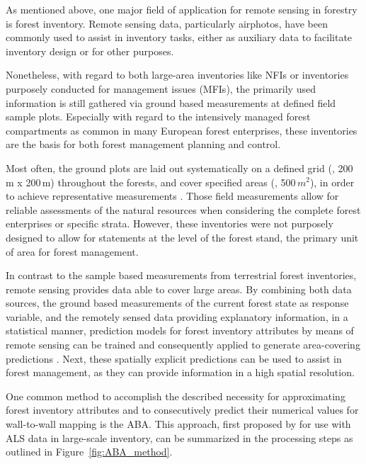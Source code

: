 As mentioned above, one major field of application for remote sensing in forestry is forest inventory.
Remote sensing data, particularly airphotos, have been commonly used to assist in inventory tasks, 
either as auxiliary data to facilitate inventory design or for other purposes. 

Nonetheless, with regard to both large-area inventories like \acp{NFI} or inventories purposely conducted for management issues
(\acsp{MFI}), the primarily used information is still gathered via ground based measurements at defined field sample plots.
Especially with regard to the intensively managed forest compartments as common in many European forest enterprises,
these inventories are the basis for both forest management planning and control. 

Most often, the ground plots are laid out systematically on a defined grid (\eg, 200\,m x 200\,m) throughout the forests, 
and cover specified areas (\eg, 500\,$m^2$), in order to achieve representative measurements \parencite[\eg,][]{Neufanger.2011}. 
Those field measurements allow for reliable assessments of the natural resources when considering the complete forest enterprises or 
specific strata. However, these inventories were not purposely designed to allow for statements at the level of the forest stand,
the primary unit of area for forest management. 

In contrast to the sample based measurements from terrestrial forest inventories, remote sensing provides data able to cover large areas.
By combining both data sources, the ground based measurements of the current forest state as response variable,
and the remotely sensed data providing explanatory information, in a statistical manner,
prediction models for forest inventory attributes by means of remote sensing can be trained and consequently applied to generate 
area-covering predictions \parencite{White.2013}. Next, these spatially explicit predictions can be used to assist in forest management, as they can provide information 
in a high spatial resolution.

One common method to accomplish the described necessity for approximating forest inventory attributes
and to consecutively predict their numerical values for wall-to-wall mapping is 
the \ac{ABA}. 
This approach,
first proposed by \textcite{Naesset.2002b} for use with \ac{ALS} data in large-scale inventory, 
can be summarized in the processing steps as outlined in Figure~\ref{fig:ABA_method}.


